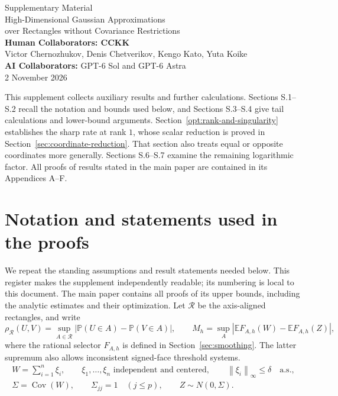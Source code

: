 \documentclass[11pt,a4paper]{article}
\theoremstyle{remark}
\newcommand{\E}{\mathbb E}
\newcommand{\Pp}{\mathbb P}
\newcommand{\Cov}{\operatorname{Cov}}
\newcommand{\norm}[1]{\left\lVert#1\right\rVert}
\newcommand{\rh}{\rho_{\mathcal R}}
\begin{document}
\begin{center}
{\Large Supplementary Material}\\[.4em]
{\large High-Dimensional Gaussian Approximations\\
over Rectangles without Covariance Restrictions}\\[.75em]
{\normalsize\textbf{Human Collaborators: CCKK}}\\[.2em]
{\normalsize Victor Chernozhukov, Denis Chetverikov, Kengo Kato, Yuta Koike}\\[.5em]
{\normalsize\textbf{AI Collaborators:} GPT-6 Sol and GPT-6 Astra}\\[.6em]
{\small 2 November 2026}
\end{center}
\noindent
This supplement collects auxiliary results and further calculations.
Sections S.1--S.2 recall the notation and bounds used below, and
Sections S.3--S.4 give tail calculations and lower-bound arguments.
Section~\ref{opt:rank-and-singularity} establishes the sharp rate at
rank \(1\), whose scalar reduction is proved in
Section~\ref{sec:coordinate-reduction}. That section also treats equal
or opposite coordinates more generally. Sections S.6--S.7 examine the
remaining logarithmic factor. All proofs of results stated in the main
paper are contained in its Appendices A--F.
\tableofcontents

\section{Notation and statements used in the proofs}\label{sec:results}
We repeat the standing assumptions and result statements needed below.
This register makes the supplement independently readable; its numbering
is local to this document. The main paper contains all proofs of its
upper bounds, including the analytic estimates and their optimization.
Let \(\mathcal R\) be the axis-aligned rectangles, and write
\[
 \rh(U,V)=\sup_{A\in\mathcal R}
 |\Pp(U\in A)-\Pp(V\in A)|,\qquad
 M_h=\sup_A|\E F_{A,h}(W)-\E F_{A,h}(Z)|,
\]
where the rational selector \(F_{A,h}\) is defined in
Section~\ref{sec:smoothing}. The latter supremum also allows
inconsistent signed-face threshold systems.
\begin{equation}
 \begin{gathered}
 W=\sum_{i=1}^n\xi_i,\qquad
 \xi_1,\ldots,\xi_n\text{ independent and centered},\qquad
 \norm{\xi_i}_\infty\le\delta\quad\text{a.s.},\\
 \Sigma=\Cov(W),\qquad \Sigma_{jj}=1\quad(j\le p),
 \qquad Z\sim N(0,\Sigma).
 \end{gathered}
 \label{eq:setup}
\end{equation}
\end{document}
